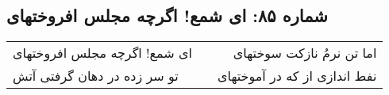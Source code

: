 \begin{center}
\section*{شماره ۸۵: ای شمع! اگرچه مجلس افروختهای}
\label{sec:085}
\begin{longtable}{l p{0.5cm} r}
ای شمع! اگرچه مجلس افروختهای
&&
اما تن نرمُ نازکت سوختهای
\\
تو سر زده در دهان گرفتی آتش
&&
نفط اندازی از که در آموختهای
\\
\end{longtable}
\end{center}
